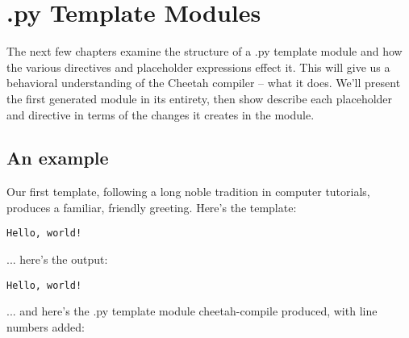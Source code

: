 \section{.py Template Modules}
\label{pyModules}

The next few chapters examine the structure of a .py template module and how 
the various directives and placeholder expressions effect it.  This will give
us a behavioral understanding of the Cheetah compiler -- what it does.  We'll
present the first generated module in its entirety, then show describe each
placeholder and directive in terms of the changes it creates in the module.

\subsection{An example}
\label{pyModules.example}

Our first template, following a long noble tradition in computer tutorials,
produces a familiar, friendly greeting.  Here's the template:

\begin{verbatim}
Hello, world!
\end{verbatim}

... here's the output:

\begin{verbatim}
Hello, world!
\end{verbatim}

... and here's the .py template module cheetah-compile produced, with line
numbers added:


